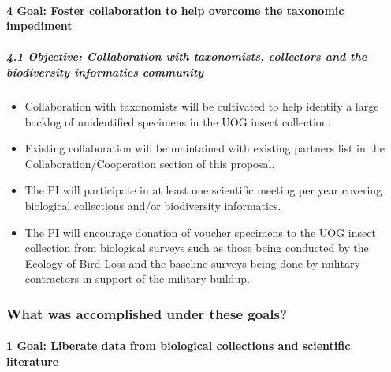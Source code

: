 \documentclass[
]{article}
\providecommand{\tightlist}{%
  \setlength{\itemsep}{0pt}\setlength{\parskip}{0pt}}
\begin{document}
\hypertarget{goal-foster-collaboration-to-help-overcome-the-taxonomic-impediment}{%
\paragraph{4 Goal: Foster collaboration to help overcome the taxonomic
impediment}\label{goal-foster-collaboration-to-help-overcome-the-taxonomic-impediment}}

\hypertarget{objective-collaboration-with-taxonomists-collectors-and-the-biodiversity-informatics-community}{%
\subparagraph{4.1 Objective: Collaboration with taxonomists, collectors
and the biodiversity informatics
community}\label{objective-collaboration-with-taxonomists-collectors-and-the-biodiversity-informatics-community}}

\begin{itemize}
\tightlist
\item
  Collaboration with taxonomists will be cultivated to help identify a
  large backlog of unidentified specimens in the UOG insect collection.
\item
  Existing collaboration will be maintained with existing partners list
  in the Collaboration/Cooperation section of this proposal.
\item
  The PI will participate in at least one scientific meeting per year
  covering biological collections and/or biodiversity informatics.
\item
  The PI will encourage donation of voucher specimens to the UOG insect
  collection from biological surveys such as those being conducted by
  the Ecology of Bird Loss and the baseline surveys being done by
  military contractors in support of the military buildup.
\end{itemize}

\hypertarget{what-was-accomplished-under-these-goals}{%
\subsubsection{What was accomplished under these
goals?}\label{what-was-accomplished-under-these-goals}}

\hypertarget{goal-liberate-data-from-biological-collections-and-scientific-literature}{%
\paragraph{1 Goal: Liberate data from biological collections and
scientific
literature}\label{goal-liberate-data-from-biological-collections-and-scientific-literature}}
\end{document}
